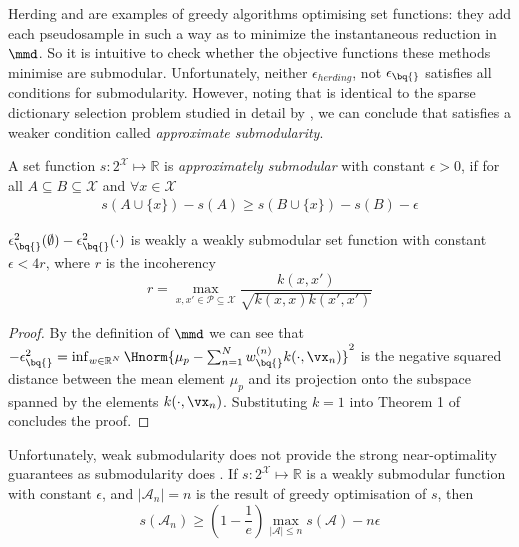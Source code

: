 Herding and \sbq{} are examples of greedy algorithms optimising set functions: they add each pseudosample in such a way as to minimize the instantaneous reduction in $\mmd$. So it is intuitive to check whether the objective functions these methods minimise are submodular. Unfortunately, neither $\epsilon_{herding}$, not $\epsilon_{\bq{}}$ satisfies all conditions for submodularity. However, noting that \sbq{} is identical to the sparse dictionary selection problem studied in detail by \citet{KrauseCevher10}, we can conclude that \sbq{} satisfies a weaker condition called \emph{approximate submodularity}. 

A set function $s:2^\mathcal{X} \mapsto \mathbb{R}$ is \textit{approximately submodular} with constant $\epsilon>0$, if for all $A\subseteq B\subseteq \mathcal{X}$ and $\forall x \in \mathcal{X}$
%
\begin{align}
s(A\cup\{x\})-s(A)\geq s(B\cup\{x\})-s(B) - \epsilon
\end{align}

\begin{proposition}\label{proposition:submodularity_SBQ}
$\epsilon^{2}_{\bq{}}(\emptyset)-\epsilon^{2}_{\bq{}}(\cdot)$ is weakly a weakly submodular set function with constant $\epsilon<4r$, where $r$ is the incoherency
\begin{equation}
	r = \max_{x,x'\in\mathcal{P}\subseteq\mathcal{X}} \frac{k(x,x')}{\sqrt{k(x,x)k(x',x')}}
\end{equation}
\end{proposition}
\begin{proof} By the definition of $\mmd$ we can see that
$-\epsilon^{2}_{\bq{}} = \inf_{w\in\mathbb{R}^N}\Hnorm{\mu_p - \sum_{n=1}^N w^{(n)}_{\bq{}}k(\cdot,\vx_n)}^2$ is the negative squared distance between the mean element $\mu_p$ and its projection onto the subspace spanned by the elements $k(\cdot,\vx_n)$. Substituting $k=1$ into Theorem 1 of \citet{KrauseCevher10} concludes the proof.
\end{proof}

Unfortunately, weak submodularity does not provide the strong near-optimality guarantees as submodularity does . If $s:2^\mathcal{X} \mapsto \mathbb{R}$ is a weakly submodular function with constant $\epsilon$, and $\vert\mathcal{A}_n\vert=n$ is the result of greedy optimisation of $s$, then
\begin{equation}
	s(\mathcal{A}_n) \geq \left(1-\frac{1}{e}\right)\max_{\vert\mathcal{A}\vert\leq n}s(\mathcal{A}) - n\epsilon
\end{equation}

